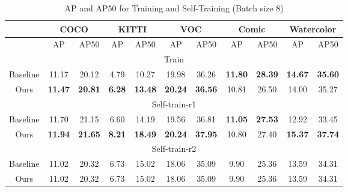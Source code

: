 \begin{table}[htbp]
	\centering
	\begin{tabular}{c|cc|cc|cc|cc|cc}
		\toprule
		& \multicolumn{2}{c|}{COCO} & \multicolumn{2}{c|}{KITTI} & \multicolumn{2}{c|}{VOC} & \multicolumn{2}{c|}{Comic} & \multicolumn{2}{c}{Watercolor} \\ \midrule
		& AP & AP50 & AP & AP50 & AP & AP50 & AP & AP50 & AP & AP50 \\ \midrule
		\multicolumn{11}{c}{Train} \\ \midrule
		Baseline & 11.17 & 20.12 & 4.79 & 10.27 & 19.98 & 36.26 & \textbf{11.80} & \textbf{28.39} & \textbf{14.67} & \textbf{35.60} \\ \midrule
		Ours & \textbf{11.47} & \textbf{20.81} & \textbf{6.28} & \textbf{13.48} & \textbf{20.24} & \textbf{36.56} & 10.81 & 26.50 & 14.00 & 35.27 \\ \midrule
		\multicolumn{11}{c}{Self-train-r1} \\ \midrule
		Baseline & 11.70 & 21.15 & 6.60 & 14.19 & 19.56 & 36.81 &  \textbf{11.05} &  \textbf{27.53} & 12.92 & 33.45 \\ \midrule
		Ours & \textbf{11.94} & \textbf{21.65} & \textbf{8.21} & \textbf{18.49} & \textbf{20.24} & \textbf{37.95} & 10.80 & 27.40 & \textbf{15.37} & \textbf{37.74} \\
		\midrule
		\multicolumn{11}{c}{Self-train-r2} \\ \midrule
		Baseline & 11.02 & 20.32 & 6.73 & 15.02 & 18.06 & 35.09 & 9.90 & 25.36 & 13.59 & 34.31 \\ \midrule
		Ours & 11.02 & 20.32 & 6.73 & 15.02 & 18.06 & 35.09 & 9.90 & 25.36 & 13.59 & 34.31 \\ \bottomrule
	\end{tabular}
	\caption{AP and AP50 for Training and Self-Training (Batch size 8)}
	\label{tab:combined_train}
\end{table}


